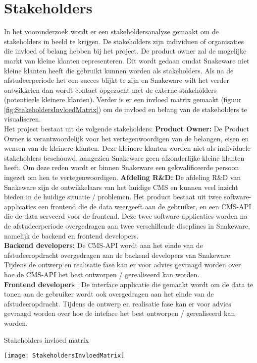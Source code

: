 \section{Stakeholders}
In het vooronderzoek wordt er een stakeholdersanalyse gemaakt om de stakeholders in beeld te krijgen.
De stakeholders zijn individuen of organisaties die invloed of belang hebben bij het project.
De product owner zal de mogelijke markt van kleine klanten representeren.
Dit wordt gedaan omdat Snakeware niet kleine klanten heeft die gebruikt kunnen worden als stakeholders.
Als na de afstudeerperiode het een succes blijkt te zijn en Snakeware wilt het verder ontwikkelen dan wordt contact opgezocht met de externe stakeholders (potentieele kleinere klanten). 
Verder is er een invloed matrix gemaakt (figuur \ref{fig:StakeholdersInvloedMatrix}) om de invloed en belang van de stakeholders te visualiseren. \\
Het project bestaat uit de volgende stakeholders:
\whitespace
\textbf{Product Owner:}
De Product Owner is verantwoordelijk voor het vertegenwoordigen van de belangen, eisen en wensen van de kleinere klanten.
Deze kleinere klanten worden niet als individuele stakeholders beschouwd, aangezien Snakeware geen afzonderlijke kleine klanten heeft.
Om deze reden wordt er binnen Snakeware een gekwalificeerde persoon ingezet om hen te vertegenwoordigen.
\whitespace
\textbf{Afdeling R\&D:} De afdeling R\&D van Snakeware zijn de ontwikkelaars van het huidige \gls{CMS} en kunnen veel inzicht bieden in de huidige situatie / problemen.
\whitespace
Het product bestaat uit twee software-applicaties een frontend die de data weergeeft aan de gebruiker, en een \gls{CMS}-API die de data serveerd voor de frontend.
Deze twee software-applicaties worden na de afstudeerperiode overgedragen aan twee verschillende diseplines in Snakeware, namelijk de backend en frontend developers.
\\
\textbf{Backend developers:} De \gls{CMS}-API wordt aan het einde van de afstudeeropdracht overgedragen aan de backend developers van Snakeware.
Tijdens de ontwerp en realisatie fase kan er voor advies gevraagd worden over hoe de \gls{CMS}-API het best ontworpen / gerealiseerd kan worden. \\
\textbf{Frontend developers} : De interface applicatie die gemaakt wordt om de data te tonen aan de gebruiker wordt ook overgedragen aan het einde van de afstudeeropdracht.
Tijdens de ontwerp en realisatie fase kan er voor advies gevraagd worden over hoe de inteface het best ontworpen / gerealiseerd kan worden.
\begin{graphic}
    \captionsetup{type=figure}
    \caption{Stakeholders invloed matrix}
    \texttt{[image: StakeholdersInvloedMatrix]}
    \label{fig:StakeholdersInvloedMatrix}
\end{graphic}
